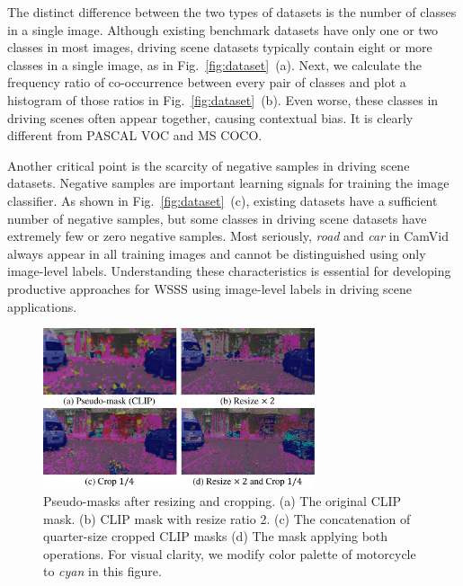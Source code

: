 \documentclass[letterpaper]{article} %
\begin{document}
The distinct difference between the two types of datasets is the number of classes in a single image. Although existing benchmark datasets have only one or two classes in most images, driving scene datasets typically contain eight or more classes in a single image, as in Fig.~\ref{fig:dataset}~(a). Next, we calculate the frequency ratio of co-occurrence between every pair of classes and plot a histogram of those ratios in Fig.~\ref{fig:dataset}~(b). Even worse, these classes in driving scenes often appear together, causing contextual bias. It is clearly different from PASCAL VOC and MS COCO.

Another critical point is the scarcity of negative samples in driving scene datasets. Negative samples are important learning signals for training the image classifier. As shown in Fig.~\ref{fig:dataset}~(c), existing datasets have a sufficient number of negative samples, but some classes in driving scene datasets have extremely few or zero negative samples. Most seriously, \textit{road} and \textit{car} in CamVid always appear in all training images and cannot be distinguished using only image-level labels. Understanding these characteristics is essential for developing productive approaches for WSSS using image-level labels in driving scene applications.

\begin{figure}[t]
\begin{center}
\includegraphics[width=8cm]{figures/fig_mask_resizencrop.pdf}
\end{center}
\caption{Pseudo-masks after resizing and cropping. (a) The original CLIP mask. (b) CLIP mask with resize ratio 2. (c) The concatenation of quarter-size cropped CLIP masks (d) The mask applying both operations. For visual clarity, we modify color palette of motorcycle to \textit{cyan} in this figure.}
\label{fig:mask_resizencrop}
\end{figure}
\end{document}
